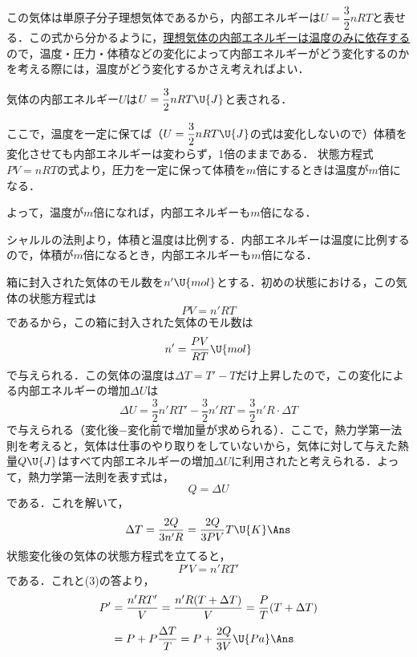 \begin{multicols}{2}
\par\nopagebreak
\begin{sisin}
この気体は単原子分子理想気体であるから，内部エネルギーは$U=\dfrac{3}{2}nRT$と表せる．この式から分かるように，\underline{理想気}\hskip0pt\underline{体の内}\hskip0pt\underline{部エネ}\hskip0pt\underline{ルギー}\hskip0pt\underline{は温度}\hskip0pt\underline{のみに}\hskip0pt\underline{依存す}\hskip0pt\underline{る}ので，温度・圧力・体積などの変化によって内部エネルギーがどう変化するのかを考える際には，温度がどう変化するかさえ考えればよい．
\end{sisin}
\KaiHead
\begin{komon}
 気体の内部エネルギー$U$は$U=\dfrac{3}{2}nRT\U{J}$と表される．\par
       \hspace*{1zw}ここで，温度を一定に保てば（$U=\dfrac{3}{2}nRT\U{J}$の式は変化しないので）体積を変化させても内部エネルギーは変わらず，1倍のままである．\Ans
{} 状態方程式$PV=nRT$の式より，圧力を一定に保って体積を$m$倍にするときは温度が$m$倍になる．\par
       \hspace*{1zw}よって，温度が$m$倍になれば，内部エネルギーも$m$倍になる．\Ans
\end{komon}
\begin{bekkai}
シャルルの法則より，体積と温度は比例する．内部エネルギーは温度に比例するので，体積が$m$倍になるとき，内部エネルギーも$m$倍になる．\Ans
\end{bekkai}
\begin{komon}
 箱に封入された気体のモル数を$n'\U{mol}$とする．初めの状態における，この気体の状態方程式は
       \[PV=n'RT\]
       であるから，この箱に封入された気体のモル数は
       \[n'=\frac{PV}{RT}\U{mol}\]
       で与えられる．この気体の温度は$\Delta T=T'-T$だけ上昇したので，この変化による内部エネルギーの増加$\Delta U$は
       \[\Delta U=\frac{3}{2}n'RT'-\frac{3}{2}n'RT=\frac{3}{2}n'R\cdot\Delta T\]
       で与えられる（変化後$-$変化前で増加量が求められる）．ここで，熱力学第一法則を考えると，気体は仕事のやり取りをしていないから，気体に対して与えた熱量$Q\U{J}$はすべて内部エネルギーの増加$\Delta U$に利用されたと考えられる．よって，熱力学第一法則を表す式は，
       \[Q=\Delta U\]
       である．これを解いて，
       \[\Delta T=\frac{2Q}{3n'R}=\frac{2Q}{3PV}T\U{K}\Ans\]
 状態変化後の気体の状態方程式を立てると，
       \[P'V=n'RT'\]
       である．これと(3)の答より，
       \[\begin{aligned}
         P'&=\frac{n'RT'}{V}=\frac{n'R(T+\Delta T)}{V}=\frac{P}{T}(T+\Delta T)\\[1mm]
         &=P+P\frac{\Delta T}{T}=P+\frac{2Q}{3V}\U{Pa}\Ans
       \end{aligned}\]
\end{komon}


\end{multicols}
